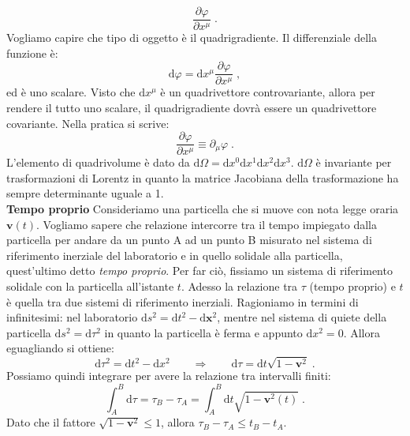 \documentclass[12pt,a4paper]{report}
\theoremstyle{definition}
\newcommand{\diff}[1][]{\mathrm{d}#1}
\begin{document}
\begin{equation}
\frac{\partial\varphi}{\partial x^{\mu}}\;.
\end{equation}
Vogliamo capire che tipo di oggetto è il quadrigradiente. Il differenziale della funzione è:
\begin{equation}
\diff{\varphi}=\diff{x^{\mu}}\frac{\partial\varphi}{\partial x^{\mu}}\;,
\end{equation}
ed è uno scalare. Visto che $\diff{x^{\mu}}$ è un quadrivettore controvariante, allora per rendere il tutto uno scalare, il quadrigradiente dovrà essere un quadrivettore covariante. Nella pratica si scrive:
\begin{equation}
\frac{\partial\varphi}{\partial x^{\mu}}\equiv \partial_{\mu}\varphi\;.
\end{equation}
L'elemento di quadrivolume è dato da $\diff{\Omega}=\diff{x^0}\diff{x^1}\diff{x^2}\diff{x^3}$. $\diff{\Omega}$ è invariante per trasformazioni di Lorentz in quanto la matrice Jacobiana della trasformazione ha sempre determinante uguale a 1. \\
\textbf{Tempo proprio}
Consideriamo una particella che si muove con nota legge oraria $\mathbf{v}(t)$. Vogliamo sapere che relazione intercorre tra il tempo impiegato dalla particella per andare da un punto A ad un punto B misurato nel sistema di riferimento inerziale del laboratorio e in quello solidale alla particella, quest'ultimo detto \emph{tempo proprio}. Per far ciò, fissiamo un sistema di riferimento solidale con la particella all'istante $t$. Adesso la relazione tra $\tau$ (tempo proprio) e $t$ è quella tra due sistemi di riferimento inerziali. Ragioniamo in termini di infinitesimi: nel laboratorio $\diff{s^2}=\diff{t^2}-\diff{\mathbf{x}^2}$, mentre nel sistema di quiete della particella $\diff{s^2}=\diff{\tau^2}$ in quanto la particella è ferma e appunto $\diff{x^2}=0$. Allora eguagliando si ottiene:
\begin{equation}
\diff{\tau^2}=\diff{t^2}-\diff{x^2}\qquad \Longrightarrow \qquad \diff{\tau}=\diff{t}\sqrt{1-\mathbf{v}^2}\;.
\end{equation}
Possiamo quindi integrare per avere la relazione tra intervalli finiti:
\begin{equation}
\int_A^B \diff{\tau}=\tau_B-\tau_A=\int_A^B\diff{t}\sqrt{1-\mathbf{v}^2(t)}\;.
\end{equation}
Dato che il fattore $\sqrt{1-\mathbf{v}^2}\le 1$, allora $\tau_B-\tau_A\le t_B-t_A$. \\
\end{document}
